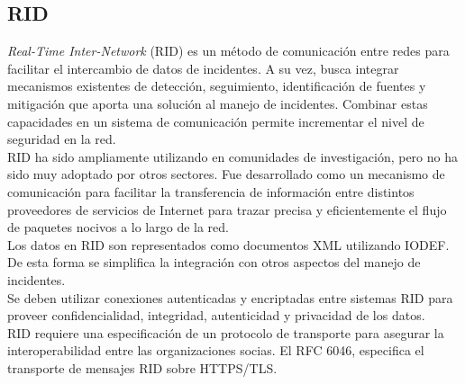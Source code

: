 \subsection{RID}

\textit{Real-Time Inter-Network} (RID) es un método de comunicación entre redes para 
facilitar el intercambio de datos de incidentes. A su vez, busca integrar 
mecanismos existentes de detección, seguimiento, identificación de fuentes y 
mitigación que aporta una solución al manejo de incidentes. Combinar estas 
capacidades en un sistema de comunicación permite incrementar el nivel de 
seguridad en la red. \\

RID ha sido ampliamente utilizando en comunidades de investigación, pero no ha 
sido muy adoptado por otros sectores. Fue desarrollado como un mecanismo de 
comunicación para facilitar la transferencia de información entre distintos 
proveedores de servicios de Internet para trazar precisa y eficientemente el 
flujo de paquetes nocivos a lo largo de la red.\\

Los datos en RID son representados como documentos XML utilizando IODEF. De esta 
forma se simplifica la integración con otros aspectos del manejo de incidentes.\\ 

Se deben utilizar 
conexiones autenticadas y encriptadas entre sistemas RID para proveer 
confidencialidad, integridad, autenticidad y privacidad de los datos. \\

RID requiere una 
especificación de un protocolo de transporte para asegurar la interoperabilidad 
entre las organizaciones socias. El RFC 6046, especifica 
el transporte de mensajes RID sobre HTTPS/TLS. 












